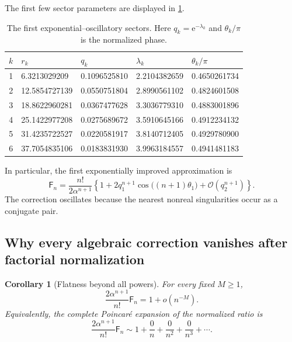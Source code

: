 \documentclass[11pt,a4paper]{article}
\newtheorem{corollary}[theorem]{Corollary}
\theoremstyle{definition}
\theoremstyle{remark}
\newcommand{\Fub}{\mathsf F}
\newcommand{\e}{\mathrm e}
\newcommand{\cO}{\mathcal O}
\begin{document}
The first few sector parameters are displayed in \cref{tab:sectors}.

\begin{table}[ht]
\centering
\caption{The first exponential--oscillatory sectors.  Here
\(q_k=\e^{-\lambda_k}\) and \(\theta_k/\pi\) is the normalized phase.}
\label{tab:sectors}
\begin{tabular}{@{}rllll@{}}
\toprule
\(k\)&\(r_k\)&\(q_k\)&\(\lambda_k\)&\(\theta_k/\pi\)\\
\midrule
1&6.3213029209&0.1096525810&2.2104382659&0.4650261734\\
2&12.5854727139&0.0550751804&2.8990561102&0.4824601508\\
3&18.8622960281&0.0367477628&3.3036779310&0.4883001896\\
4&25.1422977208&0.0275689672&3.5910645166&0.4912234132\\
5&31.4235722527&0.0220581917&3.8140712405&0.4929780900\\
6&37.7054835106&0.0183831930&3.9963184557&0.4941481183\\
\bottomrule
\end{tabular}
\end{table}

In particular, the first exponentially improved approximation is
\begin{equation}\label{eq:first-pair}
 \Fub_n=\frac{n!}{2\alpha^{n+1}}
 \left\{1+2q_1^{n+1}
 \cos\bigl((n+1)\theta_1\bigr)
 +\cO(q_2^{n+1})\right\}.
\end{equation}
The correction oscillates because the nearest nonreal singularities occur as a
conjugate pair.

\subsection{Why every algebraic correction vanishes after factorial normalization}

\begin{corollary}[Flatness beyond all powers]\label{cor:flat}
For every fixed \(M\ge1\),
\begin{equation}\label{eq:flat}
 \frac{2\alpha^{n+1}}{n!}\Fub_n
 =1+o(n^{-M}).
\end{equation}
Equivalently, the complete Poincar\'e expansion of the normalized ratio is
\begin{equation}\label{eq:poincare-zero}
 \frac{2\alpha^{n+1}}{n!}\Fub_n
 \sim 1+\frac0n+\frac0{n^2}+\frac0{n^3}+\cdots.
\end{equation}
\end{corollary}
\end{document}
